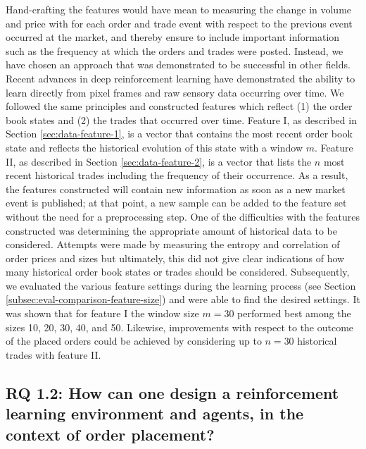 Hand-crafting the features would have mean to measuring the change in volume and price with for each order and trade event with respect to the previous event occurred at the market, and thereby ensure to include important information such as the frequency at which the orders and trades were posted.
Instead, we have chosen an approach that was demonstrated to be successful in other fields.
Recent advances in deep reinforcement learning have demonstrated the ability to learn directly from pixel frames\cite{mnih2013playing} and raw sensory data\cite{mnih2015human} occurring over time.
We followed the same principles and constructed features which reflect (1) the order book states and (2) the trades that occurred over time.
Feature I, as described in Section \ref{sec:data-feature-1}, is a vector that contains the most recent order book state and reflects the historical evolution of this state with a window $m$.
Feature II, as described in Section \ref{sec:data-feature-2}, is a vector that lists the $n$ most recent historical trades including the frequency of their occurrence.
As a result, the features constructed will contain new information as soon as a new market event is published; at that point, a new sample can be added to the feature set without the need for a preprocessing step.
One of the difficulties with the features constructed was determining the appropriate amount of historical data to be considered.
Attempts were made by measuring the entropy and correlation of order prices and sizes but ultimately, this did not give clear indications of how many historical order book states or trades should be considered.
Subsequently, we evaluated the various feature settings during the learning process (see Section \ref{subsec:eval-comparison-feature-size}) and were able to find the desired settings.
It was shown that for feature I the window size $m=30$ performed best among the sizes 10, 20, 30, 40, and 50.
Likewise, improvements with respect to the outcome of the placed orders could be achieved by considering up to $n=30$ historical trades with feature II.

\subsection{RQ 1.2: How can one design a reinforcement learning environment and agents, in the context of order placement?}

